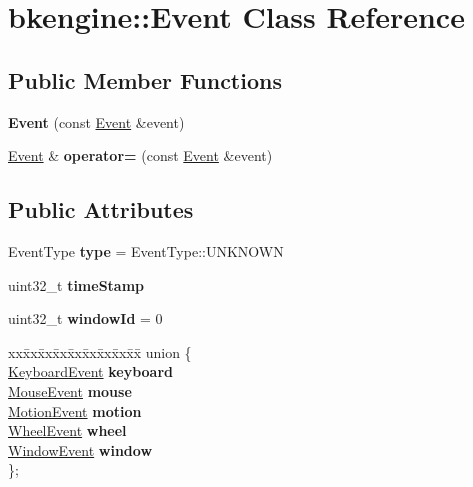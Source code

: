 \hypertarget{classbkengine_1_1Event}{}\section{bkengine\+:\+:Event Class Reference}
\label{classbkengine_1_1Event}
\subsection*{Public Member Functions}
\begin{DoxyCompactItemize}
\item 
\mbox{\label{classbkengine_1_1Event_ae8b35bf9237b74824194f87128e4fdab}} 
{\bfseries Event} (const \hyperlink{classbkengine_1_1Event}{Event} \&event)
\item 
\mbox{\label{classbkengine_1_1Event_af37245d358792cdef34ff4c76c74c022}} 
\hyperlink{classbkengine_1_1Event}{Event} \& {\bfseries operator=} (const \hyperlink{classbkengine_1_1Event}{Event} \&event)
\end{DoxyCompactItemize}
\subsection*{Public Attributes}
\begin{DoxyCompactItemize}
\item 
\mbox{\label{classbkengine_1_1Event_a8145facb5263afa33ca9f9e800ce5118}} 
Event\+Type {\bfseries type} = Event\+Type\+::\+U\+N\+K\+N\+O\+WN
\item 
uint32\+\_\+t {\bfseries time\+Stamp}
\item 
\mbox{\label{classbkengine_1_1Event_a05484dcb868d79f253c09976f924e751}} 
uint32\+\_\+t {\bfseries window\+Id} = 0
\item 
\mbox{\label{classbkengine_1_1Event_aadc58f0db80bf22bcc5fca0e7fa18ad9}} 
\begin{tabbing}
xx\=xx\=xx\=xx\=xx\=xx\=xx\=xx\=xx\=\kill
union \{\\
\>\hyperlink{structbkengine_1_1KeyboardEvent}{KeyboardEvent} {\bfseries keyboard}\\
\>\hyperlink{structbkengine_1_1MouseEvent}{MouseEvent} {\bfseries mouse}\\
\>\hyperlink{structbkengine_1_1MotionEvent}{MotionEvent} {\bfseries motion}\\
\>\hyperlink{structbkengine_1_1WheelEvent}{WheelEvent} {\bfseries wheel}\\
\>\hyperlink{structbkengine_1_1WindowEvent}{WindowEvent} {\bfseries window}\\
\}; \\

\end{tabbing}\end{DoxyCompactItemize}


